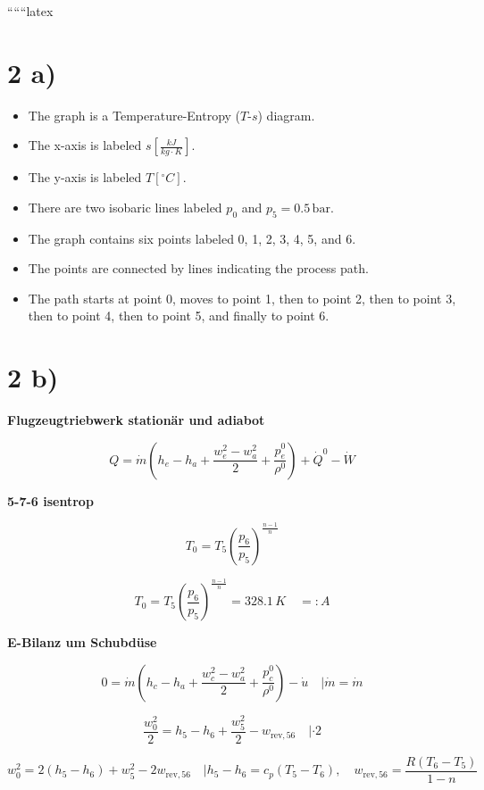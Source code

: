 
``````latex


\section*{2 a)}

\begin{itemize}
    \item The graph is a Temperature-Entropy ($T$-$s$) diagram.
    \item The x-axis is labeled $s \left[ \frac{kJ}{kg \cdot K} \right]$.
    \item The y-axis is labeled $T \left[ ^\circ C \right]$.
    \item There are two isobaric lines labeled $p_0$ and $p_5 = 0.5 \, \text{bar}$.
    \item The graph contains six points labeled 0, 1, 2, 3, 4, 5, and 6.
    \item The points are connected by lines indicating the process path.
    \item The path starts at point 0, moves to point 1, then to point 2, then to point 3, then to point 4, then to point 5, and finally to point 6.
\end{itemize}

\section*{2 b)}

\textbf{Flugzeugtriebwerk stationär und adiabot}

\[
Q = \dot{m} \left( h_e - h_a + \frac{w_e^2 - w_a^2}{2} + \frac{p_e^0}{\rho^0} \right) + \dot{Q}^0 - \dot{W}
\]

\textbf{5-7-6 isentrop}

\[
T_0 = T_5 \left( \frac{p_6}{p_5} \right)^{\frac{n-1}{n}}
\]

\[
T_0 = T_5 \left( \frac{p_6}{p_5} \right)^{\frac{n-1}{n}} = 328.1 \, K \quad =: A
\]

\textbf{E-Bilanz um Schubdüse}

\[
0 = \dot{m} \left( h_c - h_a + \frac{w_c^2 - w_a^2}{2} + \frac{p_c^0}{\rho^0} \right) - \dot{u} \quad | \dot{m} = \dot{m}
\]

\[
\frac{w_0^2}{2} = h_5 - h_6 + \frac{w_5^2}{2} - w_{\text{rev},56} \quad | \cdot 2
\]

\[
w_0^2 = 2 \left( h_5 - h_6 \right) + w_5^2 - 2 w_{\text{rev},56} \quad | h_5 - h_6 = c_p \left( T_5 - T_6 \right), \quad w_{\text{rev},56} = \frac{R \left( T_6 - T_5 \right)}{1 - n}
\]

